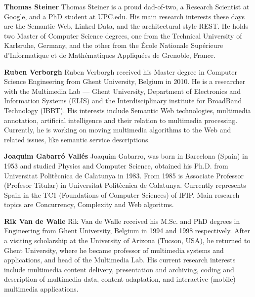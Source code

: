 \documentclass[twocolumn]{article}
\begin{document}



\vspace{5mm}

 \vspace{5mm}

\textbf{Thomas Steiner}
Thomas Steiner is a proud dad-of-two, a Research Scientist at Google, and a PhD student at UPC.edu. His main research interests these days are the Semantic Web, Linked Data, and the architectural style REST. He holds two Master of Computer Science degrees, one from the Technical University of Karlsruhe, Germany, and the other from the École Nationale Supérieure d'Informatique et de Mathématiques Appliquées de Grenoble, France.

\vspace{4mm}

\textbf{Ruben Verborgh}
Ruben Verborgh received his Master degree in Computer Science Engineering from Ghent University, Belgium in 2010. He is a researcher with the Multimedia Lab — Ghent University, Department of Electronics and Information Systems (ELIS) and the Interdisciplinary institute for BroadBand Technology (IBBT). His interests include Semantic Web technologies, multimedia annotation, artificial intelligence and their relation to multimedia processing. Currently, he is working on moving multimedia algorithms to the Web and related issues, like semantic service descriptions.

\vspace{4mm}

\textbf{Joaquim Gabarró Vallés}
Joaquim Gabarro, was born in Barcelona (Spain) in 1953 and studied Physics and Computer Science, obtained his Ph.D.
from Universitat Politècnica de Calatunya in 1983. From 1985 is Associate Professor (Profesor Titular) in Universitat Politècnica de Calatunya. Currently represents
Spain in the TC1 (Foundations of Computer Sciences) of IFIP. Main research topics
are Concurrency, Complexity and
Web algoritms.

\vspace{4mm}

\textbf{Rik Van de Walle}
Rik Van de Walle received his M.Sc. and PhD degrees in Engineering from Ghent University, Belgium in 1994 and 1998 respectively. After a visiting scholarship at the University of Arizona (Tucson, USA), he returned to Ghent University, where he became professor of multimedia systems and applications, and head of the Multimedia Lab. His current research interests include multimedia content delivery, presentation and archiving, coding and description of multimedia data, content adaptation, and interactive (mobile) multimedia applications.
\end{document}
